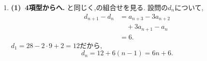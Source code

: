 \begin{enumerate}[label=\textbf{問\arabic*.},leftmargin=3.8em,format=\bookitemlink{practice-special}{solution}{problem}]
                \smallskip
                \textbf{(2)~五つの値の更新.}
                (1)より,次の表だけを調べれば十分である.
                \[
                  \begin{array}{c|rrrrr}
                    a_n&0&1&2&3&4\\ \hline
                    a_{n+1}&1&3&0&2&4
                  \end{array}
                \]
                初項$\displaystyle 1$からは$\displaystyle 1,3,2,0,1,\ldots$と進む.
                次は一意に決まるためこの四値を繰り返し,解答のとなる.
                四値が異なるので最小周期は$4$である.取り得る値を先に絞った.
          \item \textbf{(1)~4項型からへ.}
                と同じく,の組合せを見る.
                設問の$\displaystyle d_n$について,
                \begin{align*}
                  d_{n+1}-d_n
                    &=a_{n+3}-3a_{n+2}\\
                    &\quad+3a_{n+1}-a_n\\
                    &=6.
                \end{align*}
                $\displaystyle d_1=28-2\cdot9+2=12$だから,
                \[
                  d_n=12+6(n-1)=6n+6.
                \]


\end{enumerate}
